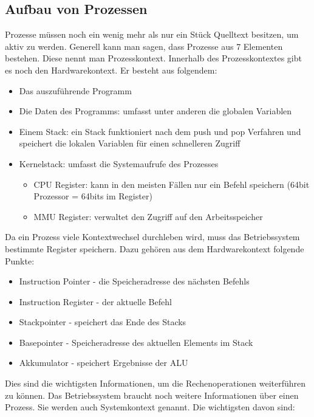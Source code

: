 \subsection{Aufbau von Prozessen}

Prozesse müssen noch ein wenig mehr als nur ein Stück Quelltext besitzen, um aktiv zu werden. Generell kann man sagen, dass Prozesse aus 7 Elementen bestehen.
Diese nennt man Prozesskontext. Innerhalb des Prozesskontextes gibt es noch den Hardwarekontext. Er besteht aus folgendem:
\begin{itemize}
    \setlength\itemsep{0pt}
    \item Das auszuführende Programm
    \item Die Daten des Programms: umfasst unter anderen die globalen Variablen
    \item Einem Stack: ein Stack funktioniert nach dem push und pop Verfahren und speichert die lokalen Variablen für einen schnelleren Zugriff
    \item Kernelstack: umfasst die Systemaufrufe des Prozesses
          \begin{itemize}
              \item CPU Register: kann in den meisten Fällen nur ein Befehl speichern (64bit Prozessor = 64bits im Register)
              \item MMU Register: verwaltet den Zugriff auf den Arbeitsspeicher
          \end{itemize}
\end{itemize}

Da ein Prozess viele Kontextwechsel durchleben wird, muss das Betriebssystem bestimmte Register speichern. Dazu gehören aus dem Hardwarekontext folgende Punkte:

\begin{itemize}
    \setlength\itemsep{0pt}
    \item Instruction Pointer - die Speicheradresse des nächsten Befehls
    \item Instruction Register - der aktuelle Befehl
    \item Stackpointer - speichert das Ende des Stacks
    \item Basepointer - Speicheradresse des aktuellen Elements im Stack
    \item Akkumulator - speichert Ergebnisse der ALU
\end{itemize}

Dies sind die wichtigsten Informationen, um die Rechenoperationen weiterführen zu können. Das Betriebssystem braucht noch weitere Informationen über einen Prozess. Sie werden auch Systemkontext genannt. Die wichtigsten davon sind:

